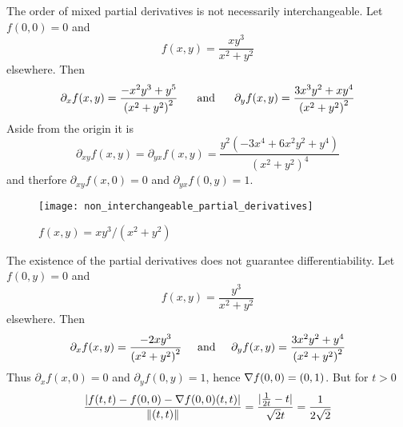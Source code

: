 \begin{remark}
    The order of mixed partial derivatives is not necessarily interchangeable. Let \( f(0,0) = 0 \) and
    \[
        f(x,y) = \frac{xy^3}{x^2 + y^2}
    \]
    elsewhere. Then
    \[
        \partial_x f(x,y) = \frac{- x^2y^3 + y^5}{{(x^2 + y^2)}^2} \mspace{25mu}\text{ and }\mspace{25mu}
        \partial_y f(x,y) = \frac{3x^3y^2 + xy^4}{{(x^2 + y^2)}^2}
    \]
    Aside from the origin it is
    \[
        \partial_{xy} f(x,y) = \partial_{yx} f(x,y) =
        \frac{y^{2} \left(- 3 x^{4} + 6 x^{2} y^{2} + y^{4}\right)}{{(x^2 + y^2)}^4}
    \]
    and therfore \( \partial_{xy}f(x,0) = 0 \) and  \( \partial_{yx}f(0,y) = 1 \).
\end{remark}
\bigskip


\begin{figure}[H]
    \centering
    \texttt{[image: non\_interchangeable\_partial\_derivatives]}
    \caption{\( f(x,y) = xy^3/(x^2 + y^2) \)}\label{fig:non_interchangeable_partial_derivatives}
\end{figure}
\bigskip

\begin{remark}
    The existence of the partial derivatives does not guarantee differentiability. Let \( f(0,y) = 0 \) and
    \[
        f(x,y) = \frac{y^3}{x^2 + y^2}
    \]
    elsewhere. Then
    \[
        \partial_x f(x,y) = \frac{-2xy^3}{{(x^2 + y^2)}^2} \mspace{25mu}\text{and}\mspace{25mu}
        \partial_y f(x,y) = \frac{3x^2y^2 + y^4}{{(x^2 + y^2)}^2}
    \]
    Thus \( \partial_x f (x, 0) = 0 \) and \( \partial_y f (0,y) = 1 \), hence
    \( \nabla f(0,0) = (0, 1) \). But for \( t > 0 \)
    \[
        \frac{|f(t,t) - f(0,0) - \nabla f(0,0) (t,t)|}{\|(t,t)\|}
        = \frac{|\frac{1}{2t} - t|}{\sqrt{2}t} = \frac{1}{2\sqrt{2}}
    \]
\end{remark}
\bigskip


